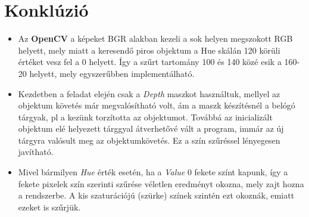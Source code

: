 \section{Konklúzió}
\begin{itemize}
	\item Az \textbf{OpenCV} a képeket BGR alakban kezeli a sok helyen megszokott RGB helyett, mely miatt a keresendő piros objektum a Hue skálán 120 körüli értéket vesz fel a 0 helyett. Így a szűrt tartomány 100 és 140 közé esik a 160-20 helyett, mely egyszerűbben implementálható.
	\item Kezdetben a feladat elején csak a \textit{Depth} maszkot használtuk, mellyel az objektum követés már megvalósítható volt, ám a maszk készítésnél a belógó tárgyak, pl a kezünk torzította az objektumot. Továbbá az inicializált objektum elé helyezett tárggyal átverhetővé vált a program, immár az új tárgyra valósult meg az objektumkövetés. Ez a szín szűréssel lényegesen javítható.
	\item Mivel bármilyen \textit{Hue} érték esetén, ha a \textit{Value} 0 fekete színt kapunk, így a fekete pixelek szín szerinti szűrése véletlen eredményt okozna, mely zajt hozna a rendszerbe. A kis szaturációjú (szürke)  színek szintén ezt okoznák, emiatt ezeket is szűrjük.

\end{itemize}







